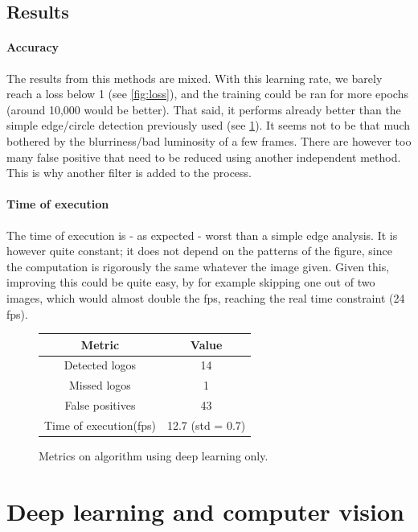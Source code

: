 \documentclass[12pt]{article}%
\begin{document}
\subsection{Results}

\paragraph{Accuracy}
The results from this methods are mixed. With this learning rate, we barely reach a loss below 1 (see \ref{fig:loss}), and the training could be ran for more epochs (around 10,000 would be better). That said, it performs already better than the simple edge/circle detection previously used (see \ref{fig:deepLearningResults}). It seems not to be that much bothered by the blurriness/bad luminosity of a few frames. There are however too many false positive that need to be reduced using another independent method. This is why another filter is added to the process.

\paragraph{Time of execution}
The time of execution is - as expected - worst than a simple edge analysis. It is however quite constant; it does not depend on the patterns of the figure, since the computation is rigorously the same whatever the image given. Given this, improving this could be quite easy, by for example skipping one out of two images, which would almost double the fps, reaching the real time constraint (24 fps).

\begin{figure}
    \centering
        \begin{tabular}{c | c}
        Metric                  & Value \\
        \hline
        Detected logos          & 14 \\
        Missed logos            & 1 \\
        False positives         & 43 \\
        Time of execution(fps)  & 12.7 (std = 0.7) \\
        \end{tabular}
    \caption{Metrics on algorithm using deep learning only.}
    \label{fig:deepLearningResults}
\end{figure}

\section{Deep learning and computer vision}
\end{document}
